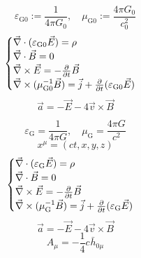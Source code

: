 \begin{equation}
    \varepsilon_{\text{G}0}:=\frac{1}{4\pi G_0},\quad
    \mu_{\text{G}0}:=\frac{4\pi G_0}{c_0^2}
\end{equation}
\begin{equation}
    \begin{cases}
        \vec{\nabla}\cdot(\varepsilon_{\text{G}0}\vec{E})=\rho\\
        \vec{\nabla}\cdot\vec{B}=0\\
        \vec{\nabla}\times\vec{E}=-\frac{\partial}{\partial t}\vec{B}\\
        \vec{\nabla}\times(\mu_{\text{G}0}^{-1}\vec{B})=\vec{j}+\frac{\partial}{\partial t}(\varepsilon_{\text{G}0}\vec{E})
    \end{cases}
\end{equation}
\begin{equation}
    \vec{a}=-\vec{E}-4\vec{v}\times\vec{B}
\end{equation}

\begin{equation}
    \varepsilon_{\text{G}}=\frac{1}{4\pi G},\quad
    \mu_{\text{G}}=\frac{4\pi G}{c^2}
\end{equation}
\begin{equation}
    x^\mu=(ct,x,y,z)
\end{equation}
\begin{equation}
    \begin{cases}
        \vec{\nabla}\cdot(\varepsilon_{\text{G}}\vec{E})=\rho\\
        \vec{\nabla}\cdot\vec{B}=0\\
        \vec{\nabla}\times\vec{E}=-\frac{\partial}{\partial t}\vec{B}\\
        \vec{\nabla}\times(\mu_{\text{G}}^{-1}\vec{B})=\vec{j}+\frac{\partial}{\partial t}(\varepsilon_{\text{G}}\vec{E})
    \end{cases}
\end{equation}
\begin{equation}
    \vec{a}=-\vec{E}-4\vec{v}\times\vec{B}
\end{equation}
\begin{equation}
    A_\mu=-\frac{1}{4}c_{}\bar{h}_{0\mu}
\end{equation}

